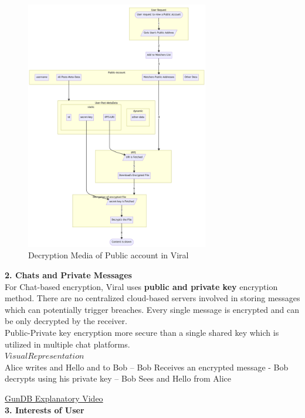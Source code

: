 \documentclass[10pt]{article}
\begin{document}
\begin{figure}[H]
\begin{center}
\includegraphics[width=8cm]{decryption-public}
\caption{Decryption Media of Public account in Viral}
\end{center}
\end{figure}




\textbf{2. Chats and Private Messages}\\

For Chat-based encryption, Viral uses \textbf{public and private key} encryption method. There are no centralized cloud-based servers involved in storing messages which can potentially trigger breaches. Every single message is encrypted and can be only decrypted by the receiver.\\

Public-Private key encryption more secure than a single shared key which is utilized in multiple chat platforms.\\

$Visual Representation$\\

Alice writes and Hello and to Bob – Bob Receives an encrypted message - Bob decrypts using his private key – Bob Sees and Hello from Alice

\hyperlink{https://sample.com}{GunDB Explanatory Video}\\

\textbf{3. Interests of User}\\
\end{document}

